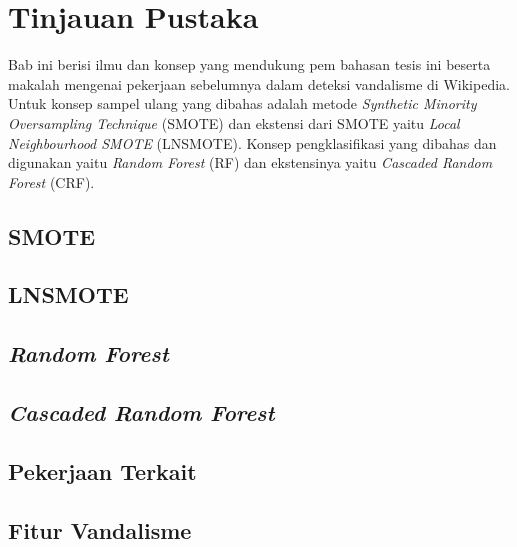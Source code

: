 \chapter{Tinjauan Pustaka}
\label{bab:02}

Bab ini berisi ilmu dan konsep yang mendukung pem bahasan tesis ini beserta
makalah mengenai pekerjaan sebelumnya dalam deteksi vandalisme di Wikipedia.
Untuk konsep sampel ulang yang dibahas adalah metode \textit{Synthetic Minority
Oversampling Technique} (SMOTE) dan ekstensi dari SMOTE yaitu
\textit{Local Neighbourhood SMOTE} (LNSMOTE).
Konsep pengklasifikasi yang dibahas dan digunakan yaitu \textit{Random Forest}
(RF) dan ekstensinya yaitu \textit{Cascaded Random Forest} (CRF).

	\section{SMOTE}
	\label{bab:02:smote}
	

	\section{LNSMOTE}
	\label{bab:02:lnsmote}
	

	\section{\textit{Random Forest}}
	\label{bab:02:rf}
	

	\section{\textit{Cascaded Random Forest}}
	\label{bab:02:crf}
	

	\section{Pekerjaan Terkait}\label{bab:02:pekerjaan_terkait}
	

	\section{Fitur Vandalisme}
	\label{bab:02:fitur_vandalisme}
	
